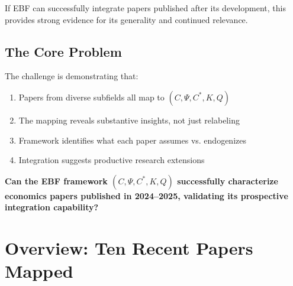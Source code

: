 If EBF can successfully integrate papers published after its development,
this provides strong evidence for its generality and continued relevance.

\subsection{The Core Problem}

The challenge is demonstrating that:
\begin{enumerate}
    \item Papers from diverse subfields all map to $(C, \Psi, C^*, K, Q)$
    \item The mapping reveals substantive insights, not just relabeling
    \item Framework identifies what each paper assumes vs. endogenizes
    \item Integration suggests productive research extensions
\end{enumerate}

\begin{tcolorbox}[colback=red!5!white, colframe=red!75!black,
    title=The Fundamental Question]
\textbf{Can the EBF framework $(C, \Psi, C^*, K, Q)$ successfully characterize
economics papers published in 2024--2025, validating its prospective
integration capability?}
\end{tcolorbox}


\section{Overview: Ten Recent Papers Mapped}
\label{sec:J-overview}

